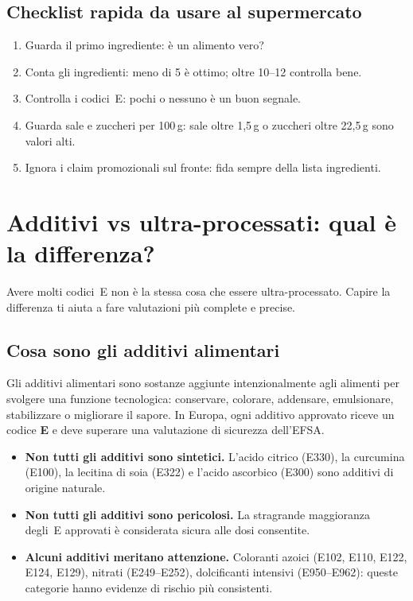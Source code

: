\documentclass[a5paper,12pt,oneside,openany]{book}
\begin{document}
\section{Checklist rapida da usare al supermercato}

\begin{enumerate}
  \item Guarda il primo ingrediente: è un alimento vero?
  \item Conta gli ingredienti: meno di 5 è ottimo; oltre 10--12 controlla
    bene.
  \item Controlla i codici~E: pochi o nessuno è un buon segnale.
  \item Guarda sale e zuccheri per 100\,g: sale oltre 1,5\,g o zuccheri
    oltre 22,5\,g sono valori alti.
  \item Ignora i claim promozionali sul fronte: fida sempre della lista
    ingredienti.
\end{enumerate}

\chapter{Additivi vs ultra-processati: qual è la differenza?}

Avere molti codici~E non è la stessa cosa che essere ultra-processato.
Capire la differenza ti aiuta a fare valutazioni più complete e precise.

\section{Cosa sono gli additivi alimentari}

Gli additivi alimentari sono sostanze aggiunte intenzionalmente agli
alimenti per svolgere una funzione tecnologica: conservare, colorare,
addensare, emulsionare, stabilizzare o migliorare il sapore. In Europa,
ogni additivo approvato riceve un codice \textbf{E} e deve superare una
valutazione di sicurezza dell'EFSA.

\begin{itemize}
  \item \textbf{Non tutti gli additivi sono sintetici.} L'acido citrico
    (E330), la curcumina (E100), la lecitina di soia (E322) e l'acido
    ascorbico (E300) sono additivi di origine naturale.
  \item \textbf{Non tutti gli additivi sono pericolosi.} La stragrande
    maggioranza degli~E approvati è considerata sicura alle dosi
    consentite.
  \item \textbf{Alcuni additivi meritano attenzione.} Coloranti azoici
    (E102, E110, E122, E124, E129), nitrati (E249--E252), dolcificanti
    intensivi (E950--E962): queste categorie hanno evidenze di rischio
    più consistenti.
\end{itemize}
\end{document}
